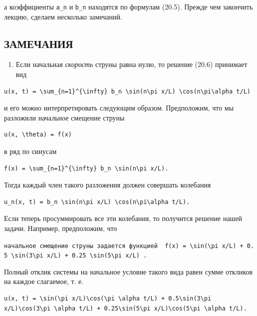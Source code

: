 \documentclass[
  ukrainian,
]{article}
\providecommand{\tightlist}{%
  \setlength{\itemsep}{0pt}\setlength{\parskip}{0pt}}
\begin{document}
а коэффициенты \texttt{a\_n} и \texttt{b\_n} находятся по формулам
(20.5). Прежде чем закончить лекцию, сделаем несколько замечаний.

\subsection{ЗАМЕЧАНИЯ}\label{ux437ux430ux43cux435ux447ux430ux43dux438ux44f-3}

\begin{enumerate}
\def\labelenumi{\arabic{enumi}.}
\tightlist
\item
  Если начальная \emph{скорость} струны равна нулю, то решение (20.6)
  принимает вид
\end{enumerate}

\begin{verbatim}
u(x, t) = \sum_{n=1}^{\infty} b_n \sin(n\pi x/L) \cos(n\pi\alpha t/L)
\end{verbatim}

и его можно интерпретировать следующим образом. Предположим, что мы
разложили начальное смещение струны

\begin{verbatim}
u(x, \theta) = f(x)
\end{verbatim}

в ряд по синусам

\begin{verbatim}
f(x) = \sum_{n=1}^{\infty} b_n \sin(n\pi x/L).
\end{verbatim}

Тогда каждый член такого разложения должен совершать колебания

\begin{verbatim}
u_n(x, t) = b_n \sin(n\pi x/L) \cos(n\pi\alpha t/L).
\end{verbatim}

Если теперь просуммировать все эти колебания, то получится решение нашей
задачи. Например, предположим, что

\texttt{начальное\ смещение\ струны\ задается\ функцией\ \ \textquotesingle{}f(x)\ =\ \textbackslash{}sin(\textbackslash{}pi\ x/L)\ +\ 0.5\ \textbackslash{}sin(3\textbackslash{}pi\ x/L)\ +\ 0.25\ \textbackslash{}sin(5\textbackslash{}pi\ x/L)\textquotesingle{}\ .}

Полный отклик системы на начальное условие такого вида равен сумме
откликов на каждое слагаемое, т. е.

\begin{verbatim}
u(x, t) = \sin(\pi x/L)\cos(\pi \alpha t/L) + 0.5\sin(3\pi x/L)\cos(3\pi \alpha t/L) + 0.25\sin(5\pi x/L)\cos(5\pi \alpha t/L).
\end{verbatim}
\end{document}
